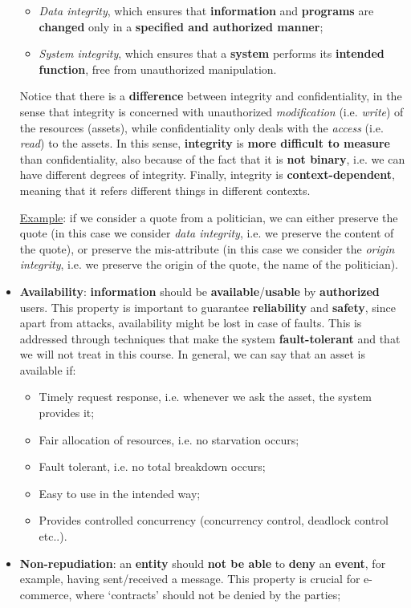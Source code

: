 \begin{itemize}
    \begin{itemize}
        \item \textit{Data integrity}, which ensures that \textbf{information} and \textbf{programs} are \textbf{changed} only in a \textbf{specified and authorized manner};
        \item \textit{System integrity}, which ensures that a \textbf{system} performs its \textbf{intended function}, free from unauthorized manipulation.
    \end{itemize}

    Notice that there is a \textbf{difference} between integrity and confidentiality, in the sense that integrity is concerned with unauthorized \textit{modification} (i.e. \textit{write}) of the resources (assets), while confidentiality only deals with the \textit{access} (i.e. \textit{read}) to the assets. In this sense, \textbf{integrity} is \textbf{more difficult to measure} than confidentiality, also because of the fact that it is \textbf{not binary}, i.e. we can have different degrees of integrity. Finally, integrity is \textbf{context-dependent}, meaning that it refers different things in different contexts. 

    \underline{Example}: if we consider a quote from a politician, we can either preserve the quote (in this case we consider \textit{data integrity}, i.e. we preserve the content of the quote), or preserve the mis-attribute (in this case we consider the \textit{origin integrity}, i.e. we preserve the origin of the quote, the name of the politician).

    \item \textbf{Availability}: \textbf{information} should be \textbf{available}/\textbf{usable} by \textbf{authorized} users. This property is important to guarantee \textbf{reliability} and \textbf{safety}, since apart from attacks, availability might be lost in case of faults. This is addressed through techniques that make the system \textbf{fault-tolerant} and that we will not treat in this course. In general, we can say that an asset is available if:

    \begin{itemize}
        \item Timely request response, i.e. whenever we ask the asset, the system provides it;
        \item Fair allocation of resources, i.e. no starvation occurs;
        \item Fault tolerant, i.e. no total breakdown occurs;
        \item Easy to use in the intended way;
        \item Provides controlled concurrency (concurrency control, deadlock control etc..).
    \end{itemize}
    
    \item \textbf{Non-repudiation}: an \textbf{entity} should \textbf{not be able} to \textbf{deny} an \textbf{event}, for example, having sent/received a message. This property is crucial for e-commerce, where ‘contracts’ should not be denied by the parties;
    
\end{itemize}

